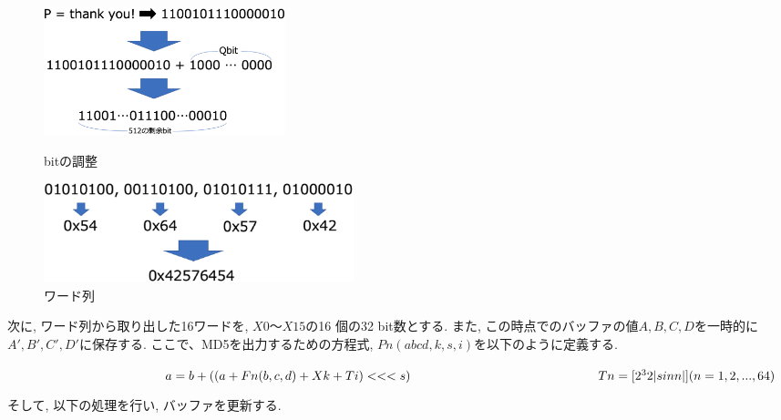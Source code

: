 \begin{figure}[htbp]
 \begin{minipage}{0.5\hsize}
  \begin{center}
   \includegraphics[width=70mm]{bitretu.eps}
  \end{center}
  \caption{bitの調整}
  \label{bit}
 \end{minipage}
 \begin{minipage}{0.5\hsize}
  \begin{center}
   \includegraphics[width=90mm]{wordretu.eps}
  \end{center}
  \caption{ワード列}
  \label{wordretu}
 \end{minipage}
\end{figure}

次に, ワード列から取り出した16ワードを, $X0 ～ X15$の16 個の32 bit数とする. また, この時点でのバッファの値$A, B, C, D$を一時的に$A', B', C', D'$に保存する.
ここで、MD5を出力するための方程式, $Pn(abcd, k, s, i)$を以下のように定義する.
\newline

$\hspace{120pt} a = b + ((a + Fn(b, c, d) + Xk + Ti) <<< s) \\
\hspace{150pt} Tn = [2^32 |sinn|] (n = 1, 2, ...,64) \\
$

そして, 以下の処理を行い, バッファを更新する.

